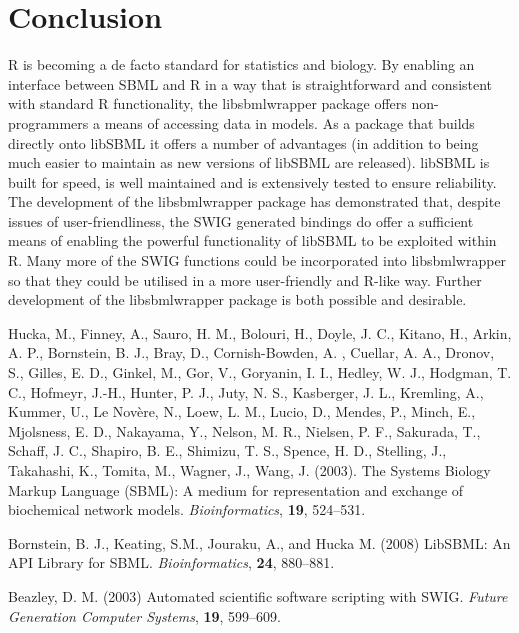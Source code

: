 \documentclass{bioinfo}
\begin{document}
\section{Conclusion}
R is becoming a de facto standard for statistics and biology. By enabling an interface between SBML and R in a way that is straightforward and consistent with standard R functionality, the libsbmlwrapper package offers non-programmers a means of accessing data in models. As a package that builds directly onto libSBML it offers a number of advantages (in addition to being much easier to maintain as new versions of libSBML are released). libSBML is built for speed, is well maintained and is extensively tested to ensure reliability. The development of the libsbmlwrapper package has demonstrated that, despite issues of user-friendliness, the SWIG generated bindings do offer a sufficient means of enabling the powerful functionality of libSBML to be exploited within R. Many more of the SWIG functions could be incorporated into libsbmlwrapper so that they could be utilised in a more user-friendly and R-like way. Further development of the libsbmlwrapper package is both possible and desirable.

%
%
%
%
%
%
%
%
%


\begin{thebibliography}{}

 Hucka, M., Finney, A., Sauro, H. M., Bolouri, H., Doyle, J. C., Kitano, H., Arkin, A. P., Bornstein, B. J., Bray, D., Cornish-Bowden, A. , Cuellar, A. A., Dronov, S., Gilles, E. D., Ginkel, M., Gor, V., Goryanin, I. I., Hedley, W. J., Hodgman, T. C., Hofmeyr, J.-H., Hunter, P. J., Juty, N. S., Kasberger, J. L., Kremling, A., Kummer, U., Le Novère, N., Loew, L. M., Lucio, D., Mendes, P., Minch, E., Mjolsness, E. D., Nakayama, Y., Nelson, M. R., Nielsen, P. F., Sakurada, T., Schaff, J. C., Shapiro, B. E., Shimizu, T. S., Spence, H. D., Stelling, J., Takahashi, K., Tomita, M., Wagner, J., Wang, J. (2003). The Systems Biology Markup Language (SBML): A medium for representation and exchange of biochemical network models. {\it Bioinformatics}, {\bf 19}, 524–531.

 Bornstein, B. J., Keating, S.M., Jouraku, A., and Hucka M. (2008) LibSBML: An API Library for SBML. {\it Bioinformatics}, {\bf 24}, 880–881.

 Beazley, D. M. (2003) Automated scientific software scripting with SWIG. {\it Future Generation Computer Systems}, {\bf 19}, 599–609.

\end{thebibliography}
\end{document}
